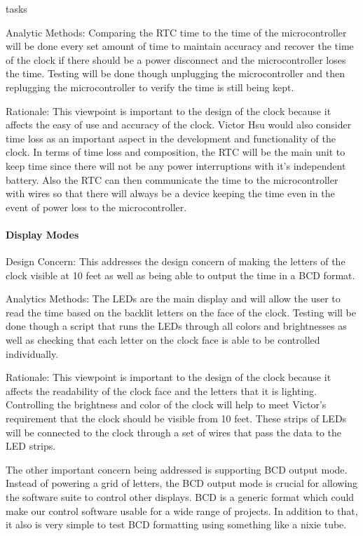tasks\documentclass[onecolumn, draftclsnofoot,10pt, compsoc]{IEEEtran}
\begin{document}
\vspace{2mm} Analytic Methods: Comparing the RTC time to the time of the microcontroller will be done every set amount of time to maintain accuracy and recover the time of the clock if there should be a power disconnect and the microcontroller loses the time.
Testing will be done though unplugging the microcontroller and then replugging the microcontroller to verify the time is still being kept.

\vspace{2mm} Rationale: This viewpoint is important to the design of the clock because it affects the easy of use and accuracy of the clock.
Victor Hsu would also consider time loss as an important aspect in the development and functionality of the clock.
In terms of time loss and composition, the RTC will be the main unit to keep time since there will not be any power interruptions with it's independent battery.
Also the RTC can then communicate the time to the microcontroller with wires so that there will always be a device keeping the time even in the event of power loss to the microcontroller.

\paragraph{Display Modes}
\vspace{2mm} Design Concern: This addresses the design concern of making the letters of the clock visible at 10 feet as well as being able to output the time in a BCD format.

\vspace{2mm} Analytics Methods: The LEDs are the main display and will allow the user to read the time based on the backlit letters on the face of the clock.
Testing will be done though a script that runs the LEDs through all colors and brightnesses as well as checking that each letter on the clock face is able to be controlled individually.

\vspace{2mm} Rationale: This viewpoint is important to the design of the clock because it affects the readability of the clock face and the letters that it is lighting.
Controlling the brightness and color of the clock will help to meet Victor's requirement that the clock should be visible from 10 feet.
These strips of LEDs will be connected to the clock through a set of wires that pass the data to the LED strips.

The other important concern being addressed is supporting BCD output mode.
Instead of powering a grid of letters, the BCD output mode is crucial for allowing the software suite to control other displays.
BCD is a generic format which could make our control software usable for a wide range of projects.
In addition to that, it also is very simple to test BCD formatting using something like a nixie tube.
\end{document}
